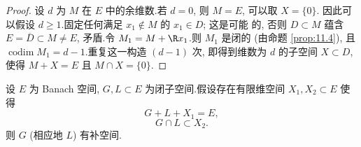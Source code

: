 \begin{proof}
设 $d$ 为 $M$ 在 $E$ 中的余维数.若 $d=0$, 则 $M=E$, 可以取 $X=\{0\}$.
因此可以假设 $d\ge1$.固定任何满足 $x_1\notin M$ 的 $x_1\in D$; 这是可能
的, 否则 $D\subset M$ 蕴含 $E=\overline D\subset M\ne E$, 矛盾.令
$M_1=M+\R x_1$.则 $M_1$ 是闭的 (由命题  \ref{prop:11.4}), 且
$\operatorname{codim}M_1=d-1$.重复这一构造 $(d-1)$ 次, 即得到维数为 $d$
的子空间 $X\subset D$, 使得 $M+X=E$ 且 $M\cap X=\{0\}$.
\end{proof}

\begin{proposition}
\label{prop:11.7}
设 $E$ 为 Banach 空间, $G,L\subset E$ 为闭子空间.假设存在有限维空间
$X_1,X_2\subset E$ 使得
\begin{equation}
G+L+X_1=E,
\label{eq:11.1}
\end{equation}
\begin{equation}
G\cap L\subset X_2.
\label{eq:11.2}
\end{equation}
则 $G$ (相应地 $L$) 有补空间.
\end{proposition}

